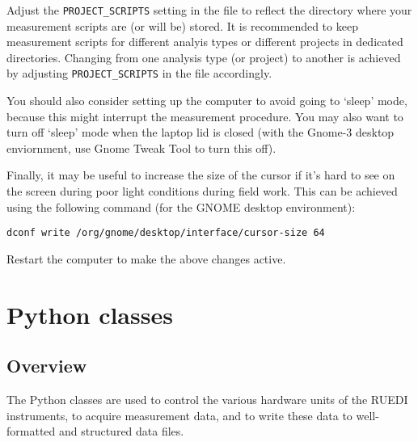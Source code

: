 \documentclass[12pt]{article}   	%
\begin{document}
\begin{enumerate}
Adjust the \texttt{PROJECT_SCRIPTS} setting in the  file to reflect the directory where your measurement scripts are (or will be) stored. It is recommended to keep measurement scripts for different analyis types or different projects in dedicated directories. Changing from one analysis type (or project) to another is achieved by adjusting \texttt{PROJECT_SCRIPTS} in the  file accordingly.

\end{enumerate}

You should also consider setting up the computer to avoid going to `sleep' mode, because this might interrupt the measurement procedure. You may also want to turn off `sleep' mode when the laptop lid is closed (with the Gnome-3 desktop enviornment, use Gnome Tweak Tool to turn this off).\par


\enlargethispage{2\baselineskip}

Finally, it may be useful to increase the size of the cursor if it's hard to see on the screen during poor light conditions during field work. This can be achieved using the following command (for the GNOME desktop environment):\par
\mbox{\texttt{dconf write /org/gnome/desktop/interface/cursor-size 64}}

Restart the computer to make the above changes active.\par


\section{Python classes}
\subsection{Overview}
The Python classes are used to control the various hardware units of the RUEDI instruments, to acquire measurement data, and to write these data to well-formatted and structured data files.\par
\end{document}
